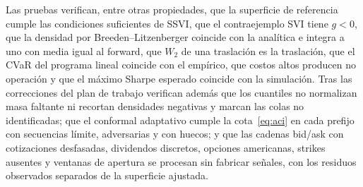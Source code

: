 Las pruebas verifican, entre otras propiedades, que la superficie de referencia cumple las condiciones
suficientes de SSVI, que el contraejemplo SVI tiene $g<0$, que la densidad por Breeden--Litzenberger
coincide con la analítica e integra a uno con media igual al forward, que $W_2$ de una traslación es la
traslación, que el CVaR del programa lineal coincide con el empírico, que costos altos producen no
operación y que el máximo Sharpe esperado coincide con la simulación. Tras las correcciones del plan de
trabajo verifican además que los cuantiles no normalizan masa faltante ni recortan densidades negativas
y marcan las colas no identificadas; que el conformal adaptativo cumple la cota~\eqref{eq:aci} en cada
prefijo con secuencias límite, adversarias y con huecos; y que las cadenas bid/ask con cotizaciones
desfasadas, dividendos discretos, opciones americanas, strikes ausentes y ventanas de apertura se
procesan sin fabricar señales, con los residuos observados separados de la superficie ajustada.
